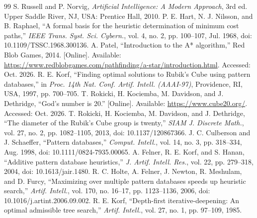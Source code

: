 \begin{thebibliography}{99}
     S. Russell and P. Norvig, \textit{Artificial Intelligence: A Modern Approach}, 3rd ed. Upper Saddle River, NJ, USA: Prentice Hall, 2010.
     P. E. Hart, N. J. Nilsson, and B. Raphael, ``A formal basis for the heuristic determination of minimum cost paths,'' \textit{IEEE Trans. Syst. Sci. Cybern.}, vol. 4, no. 2, pp. 100--107, Jul. 1968, doi: 10.1109/TSSC.1968.300136.
     A. Patel, ``Introduction to the A* algorithm,'' Red Blob Games, 2014. [Online]. Available: \url{https://www.redblobgames.com/pathfinding/a-star/introduction.html}. Accessed: Oct. 2026.
     R. E. Korf, ``Finding optimal solutions to Rubik's Cube using pattern databases,'' in \textit{Proc. 14th Nat. Conf. Artif. Intell. (AAAI-97)}, Providence, RI, USA, 1997, pp. 700--705.
     T. Rokicki, H. Kociemba, M. Davidson, and J. Dethridge, ``God's number is 20.'' [Online]. Available: \url{https://www.cube20.org/}. Accessed: Oct. 2026.
     T. Rokicki, H. Kociemba, M. Davidson, and J. Dethridge, ``The diameter of the Rubik's Cube group is twenty,'' \textit{SIAM J. Discrete Math.}, vol. 27, no. 2, pp. 1082--1105, 2013, doi: 10.1137/120867366.
     J. C. Culberson and J. Schaeffer, ``Pattern databases,'' \textit{Comput. Intell.}, vol. 14, no. 3, pp. 318--334, Aug. 1998, doi: 10.1111/0824-7935.00065.
     A. Felner, R. E. Korf, and S. Hanan, ``Additive pattern database heuristics,'' \textit{J. Artif. Intell. Res.}, vol. 22, pp. 279--318, 2004, doi: 10.1613/jair.1480.
     R. C. Holte, A. Felner, J. Newton, R. Meshulam, and D. Furcy, ``Maximizing over multiple pattern databases speeds up heuristic search,'' \textit{Artif. Intell.}, vol. 170, no. 16--17, pp. 1123--1136, 2006, doi: 10.1016/j.artint.2006.09.002.
     R. E. Korf, ``Depth-first iterative-deepening: An optimal admissible tree search,'' \textit{Artif. Intell.}, vol. 27, no. 1, pp. 97--109, 1985.
\end{thebibliography}
